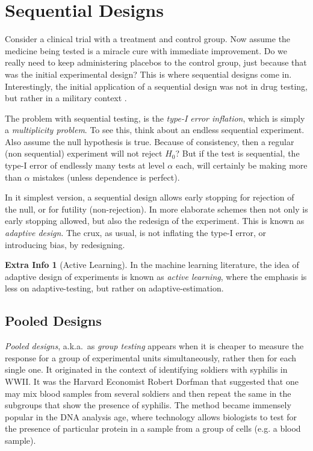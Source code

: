 \documentclass[12pt,a4paper]{report}
\theoremstyle{plain}
\theoremstyle{definition}
\newtheorem{extra}{Extra Info}
\newcommand{\aka}{{a.k.a.\ }}
\begin{document}
\section{Sequential Designs}
\label{sec:sequantial}

Consider a clinical trial with a treatment and control group.
Now assume the medicine being tested is a miracle cure with immediate improvement. 
Do we really need to keep administering placebos to the control group, just because that was the initial experimental design?
This is where sequential designs come in.
Interestingly, the initial application of a sequential design was not in drug testing, but rather in a military context \citep{wald_sequential_1945}.

The problem with sequential testing, is the \emph{type-I error inflation}, which is simply a \emph{multiplicity problem}. 
To see this, think about an endless sequential experiment. Also assume the null hypothesis is true. 
Because of consistency, then a regular (non sequential) experiment will not reject $H_0$?
But if the test is sequential, the type-I error of endlessly many tests at level $\alpha$ each, will certainly be making more than $\alpha$ mistakes (unless dependence is perfect).

In it simplest version, a sequential design allows early stopping for rejection of the null, or for futility (non-rejection). 
In more elaborate schemes then not only is early stopping allowed, but also the redesign of the experiment. 
This is known as \emph{adaptive design}. The crux, as usual, is not inflating the type-I error, or introducing bias, by redesigning.

\begin{extra}[Active Learning]
In the machine learning literature, the idea of adaptive design of experiments is known as \emph{active learning}, where the emphasis is less on adaptive-testing, but rather on adaptive-estimation.
\end{extra}




\subsection{Pooled Designs}
\emph{Pooled designs}, \aka as \emph{group testing} appears when it is cheaper to measure the response for a group of experimental units simultaneously, rather then for each single one. 
It originated in the context of identifying soldiers with syphilis in WWII. It was the Harvard Economist Robert Dorfman that suggested \cite{dorfman_detection_1943} that one may mix blood samples from several soldiers and then repeat the same in the subgroups that show the presence of syphilis. 
The method became immensely popular in the DNA analysis age, where technology allows biologists to test for the presence of particular protein in a sample from a group of cells (e.g. a blood sample). 
\end{document}
